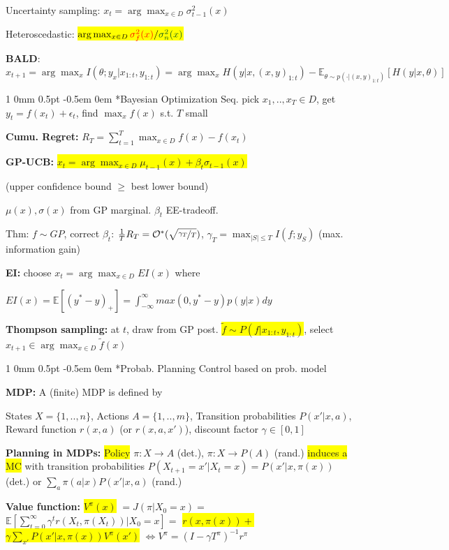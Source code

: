 \documentclass[11pt,landscape,a4paper,fleqn]{article}
\makeatletter
\newcommand*{\rsection}{%
	\@startsection{section}%
	{1}%
	{0mm}%
	{0.5pt}%
	{-0.5em \@plus 0em}
	{\color{myorange}\sffamily\small\bfseries}}
\newcommand{\mhl}[1]{\setlength{\fboxsep}{0pt}\colorbox{yellow}{#1}}
\makeatother
\begin{document}
\begin{multicols*}{4}
Uncertainty sampling: $x_t = \arg\max_{x \in D} \sigma_{t-1}^2(x)$

Heteroscedastic: \mhl{$\arg\max_{x \in D} {\textcolor{red}{\sigma_f^2(x)}}/{\textcolor{darkgreen}{\sigma_n^2(x)}}$}


\textbf{BALD}: $x_{t+1} = \arg\max_x I(\theta; y_x | x_{1:t}, y_{1:t}) = \arg\max_x H(y | x, (x,y)_{1:t}) - \mathbb{E}_{\theta \sim p(\cdot | (x,y)_{1:t})}[H(y | x, \theta)]$

\vspace*{1mm}
\rsection*{Bayesian Optimization} Seq. pick $x_1,..,x_T \in D$, get $y_t = f(x_t) + \epsilon_t$, find $\max_x f(x)$ s.t. $T$ small

\textbf{Cumu. Regret:} $R_T = \sum_{t=1}^{T} \max_{x \in D} f(x) - f(x_t)$

\textbf{GP-UCB:} \mhl{$x_t = \arg\max_{x \in D} \mu_{t-1}(x) + \beta_t \sigma_{t-1}(x)$}

(upper confidence bound $\geq$ best lower bound)

$\mu(x), \sigma(x)$ from GP marginal. $\beta_t$ EE-tradeoff.

Thm: $f \sim GP$, correct $\beta_t$: $\frac{1}{T}R_T = \mathcal{O}^*(\sqrt{\nicefrac{\gamma_T}{T}})$, $\gamma_T = \max_{|S| \leq T} I(f; y_S)$ (max. information gain)

\textbf{EI:} choose $x_t = \arg\max_{x \in D} EI(x)$ where

$EI(x) = \mathbb{E}[(y^* - y)_+] = \int_{-\infty}^{\infty} max(0, y^* - y) p(y | x) dy$



\textbf{Thompson sampling:} at $t$, draw from GP post. \mhl{$\tilde{f} \sim P(f | x_{1:t}, y_{1:t})$}, select $x_{t+1} \in \arg\max_{x \in D} \tilde{f}(x)$


\rsection*{Probab. Planning} {\fontsize{9}{6}\selectfont Control based on prob. model}

\textbf{MDP:} A (finite) MDP is defined by

States $X = \{1,..,n\}$,
Actions $A = \{1,..,m\}$,
Transition probabilities $P(x' | x,a)$,
Reward function $r(x,a)$ (or $r(x,a,x')$),
discount factor $\gamma \in [0,1]$

\textbf{Planning in MDPs:} \mhl{Policy} $\pi: X \rightarrow A$ (det.), $\pi: X \rightarrow P(A)$ (rand.) \mhl{induces a MC} with transition probabilities $P(X_{t+1} = x' | X_t = x) = P(x' | x, \pi(x))$ (det.) or $\sum_a \pi(a | x) P(x' | x, a)$ (rand.)

\textbf{Value function:} \mhl{$V^\pi(x)$} $ = J(\pi | X_0 = x) =$
$\mathbb{E}[\sum_{t=0}^{\infty} \gamma^t r(X_t, \pi(X_t)) | X_0 = x] =$ \mhl{$r(x, \pi(x)) +$}
\mhl{$\gamma \sum_{x'} P(x' | x, \pi(x)) V^\pi(x')$} $\Leftrightarrow V^\pi = (I - \gamma T^\pi)^{-1} r^\pi$


\end{multicols*}
\end{document}
